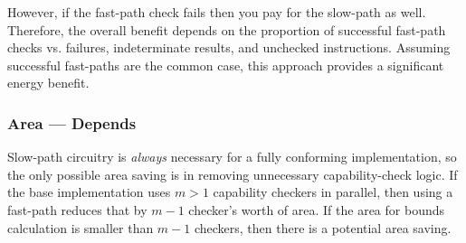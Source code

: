 However, if the fast-path check fails then you pay for the slow-path as well.
Therefore, the overall benefit depends on the proportion of successful fast-path checks vs. failures, indeterminate results, and unchecked instructions.
Assuming successful fast-paths are the common case, this approach provides a significant energy benefit.





\subsubsection*{Area --- Depends}
Slow-path circuitry is \emph{always} necessary for a fully conforming implementation, so the only possible area saving is in removing unnecessary capability-check logic.
If the base implementation uses $m > 1$ capability checkers in parallel, then using a fast-path reduces that by $m - 1$ checker's worth of area.
If the area for bounds calculation is smaller than $m - 1$ checkers, then there is a potential area saving.


